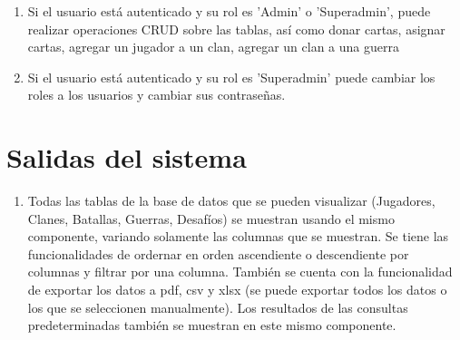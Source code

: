 \documentclass[15pt,a4paper]{article}
\begin{document}
\begin{enumerate}
    \item Si el usuario está autenticado y su rol es 'Admin' o  'Superadmin', puede realizar operaciones CRUD sobre las tablas, así como donar cartas, asignar cartas, agregar un jugador a un clan, agregar un clan a una guerra
    \item Si el usuario está autenticado y su rol es 'Superadmin' puede cambiar los roles a los usuarios y cambiar sus contraseñas.

\end{enumerate}

\section{Salidas del sistema}

\begin{enumerate}
    \item Todas las tablas de la base de datos que se pueden visualizar (Jugadores, Clanes, Batallas, Guerras, Desafíos) se muestran usando el mismo componente, variando solamente las columnas que se muestran. Se tiene las funcionalidades de ordernar en orden ascendiente o descendiente por columnas y filtrar por una columna. También se cuenta con la funcionalidad de exportar los datos a pdf, csv y xlsx (se puede exportar todos los datos o los que se seleccionen manualmente). Los resultados de las consultas predeterminadas también se muestran en este mismo componente.


\end{enumerate}
\end{document}
